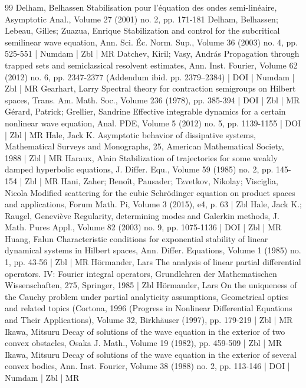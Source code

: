 \begin{thebibliography}{99}
Delham, Belhassen Stabilisation pour l’équation des ondes semi-linéaire, Asymptotic Anal., Volume 27 (2001) no. 2, pp. 171-181
Delham, Belhassen; Lebeau, Gilles; Zuazua, Enrique Stabilization and control for the subcritical semilinear wave equation, Ann. Sci. Éc. Norm. Sup., Volume 36 (2003) no. 4, pp. 525-551 | Numdam | Zbl | MR
Datchev, Kiril; Vasy, András Propagation through trapped sets and semiclassical resolvent estimates, Ann. Inst. Fourier, Volume 62 (2012) no. 6, pp. 2347-2377 (Addendum ibid. pp. 2379–2384) | DOI | Numdam | Zbl | MR
Gearhart, Larry Spectral theory for contraction semigroups on Hilbert spaces, Trans. Am. Math. Soc., Volume 236 (1978), pp. 385-394 | DOI | Zbl | MR
Gérard, Patrick; Grellier, Sandrine Effective integrable dynamics for a certain nonlinear wave equation, Anal. PDE, Volume 5 (2012) no. 5, pp. 1139-1155 | DOI | Zbl | MR
Hale, Jack K. Asymptotic behavior of dissipative systems, Mathematical Surveys and Monographs, 25, American Mathematical Society, 1988 | Zbl | MR
Haraux, Alain Stabilization of trajectories for some weakly damped hyperbolic equations, J. Differ. Equ., Volume 59 (1985) no. 2, pp. 145-154 | Zbl | MR
Hani, Zaher; Benoît, Pausader; Tzvetkov, Nikolay; Visciglia, Nicola Modified scattering for the cubic Schrödinger equation on product spaces and applications, Forum Math. Pi, Volume 3 (2015), e4, p. 63 | Zbl
Hale, Jack K.; Raugel, Geneviève Regularity, determining modes and Galerkin methods, J. Math. Pures Appl., Volume 82 (2003) no. 9, pp. 1075-1136 | DOI | Zbl | MR
Huang, Falun Characteristic conditions for exponential stability of linear dynamical systems in Hilbert spaces, Ann. Differ. Equations, Volume 1 (1985) no. 1, pp. 43-56 | Zbl | MR
Hörmander, Lars The analysis of linear partial differential operators. IV: Fourier integral operators, Grundlehren der Mathematischen Wissenschaften, 275, Springer, 1985 | Zbl
Hörmander, Lars On the uniqueness of the Cauchy problem under partial analyticity assumptions, Geometrical optics and related topics (Cortona, 1996 (Progress in Nonlinear Differential Equations and Their Applications), Volume 32, Birkhäuser (1997), pp. 179-219 | Zbl | MR
Ikawa, Mitsuru Decay of solutions of the wave equation in the exterior of two convex obstacles, Osaka J. Math., Volume 19 (1982), pp. 459-509 | Zbl | MR
Ikawa, Mitsuru Decay of solutions of the wave equation in the exterior of several convex bodies, Ann. Inst. Fourier, Volume 38 (1988) no. 2, pp. 113-146 | DOI | Numdam | Zbl | MR

\end{thebibliography}
